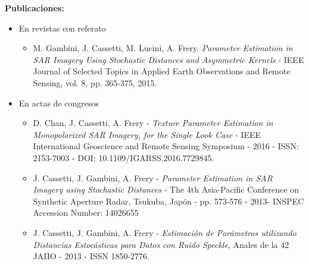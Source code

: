 	\vspace{1cm}


\textbf{Publicaciones:}
\begin{itemize}
	\item En revistas con referato
	\begin{itemize}
		\item M. Gambini, J. Cassetti, M. Lucini, A. Frery. \emph{Parameter Estimation in SAR Imagery Using Stochastic Distances and Asymmetric Kernels} - IEEE Journal of Selected Topics in Applied Earth Observations and Remote Sensing, vol. 8, pp. 365-375, 2015.
	\end{itemize}
	\item En actas de congresos
	\begin{itemize}
		\item  D. Chan, J. Cassetti, A. Frery - \emph{Texture Parameter Estimation in Monopolarized SAR Imagery, for the Single Look Case} - IEEE International Geoscience and Remote Sensing Symposium - 2016 - ISSN: 2153-7003 -  DOI: 10.1109/IGARSS.2016.7729845.
		
		\item J. Cassetti, J. Gambini, A. Frery - \emph{Parameter Estimation in SAR Imagery using Stochastic Distances} - The 4th Asia-Pacific Conference on Synthetic Aperture Radar, Tsukuba, Japón - pp. 573-576 - 2013- INSPEC Accession Number: 14026655 
		
		\item J. Cassetti, J. Gambini, A. Frery - \emph{Estimación de Parámetros utilizando Distancias Estocásticas para Datos con Ruido Speckle}, Anales de la 42 JAIIO - 2013 - ISSN 1850-2776.
	\end{itemize}
\end{itemize}

